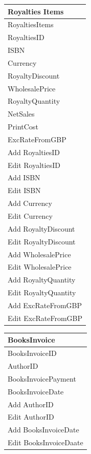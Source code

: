 \begin{tabular}{|p{4cm}|}
    \hline
    \textbf{Royalties Items} \\ \hline
    RoyaltiesItems \\ RoyaltiesID \\ ISBN \\ Currency \\ RoyaltyDiscount \\ WholesalePrice \\ RoyaltyQuantity \\ NetSales \\ PrintCost \\ ExcRateFromGBP \\ \hline
    Add RoyaltiesID \\ Edit RoyaltiesID \\ Add ISBN \\ Edit ISBN \\ Add Currency \\ Edit Currency \\ Add RoyaltyDiscount \\ Edit RoyaltyDiscount \\ Add WholesalePrice \\ Edit WholesalePrice \\ Add RoyaltyQuantity \\ Edit RoyaltyQuantity \\ Add ExcRateFromGBP \\ Edit ExcRateFromGBP \\ \hline
\end{tabular}

\begin{tabular}{|p{4cm}|}
    \hline
    \textbf{BooksInvoice} \\ \hline
    BooksInvoiceID \\ AuthorID \\ BooksInvoicePayment \\ BooksInvoiceDate \\ \hline
    Add AuthorID \\ Edit AuthorID \\ Add BooksInvoiceDate \\ Edit BooksInvoiceDaate \\ \hline
\end{tabular}


